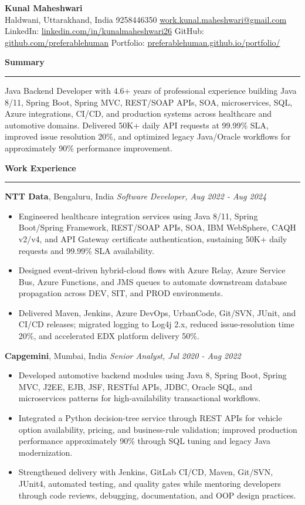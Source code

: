 \documentclass[10pt,letterpaper]{article}
\newcommand{\ressection}[1]{\vspace{3pt}\par\textbf{#1}\par\vspace{1pt}\hrule\vspace{2pt}}
\begin{document}
\pagestyle{empty}\raggedright\fontsize{10.15}{11.05}\selectfont

{\Large \textbf{Kunal Maheshwari}}\\
Haldwani, Uttarakhand, India \textbar{} 9258446350 \textbar{} \href{mailto:work.kunal.maheshwari@gmail.com}{work.kunal.maheshwari@gmail.com}\\
LinkedIn: \href{https://www.linkedin.com/in/kunalmaheshwari26}{linkedin.com/in/kunalmaheshwari26} \textbar{} GitHub: \href{https://github.com/preferablehuman}{github.com/preferablehuman} \textbar{} Portfolio: \href{https://preferablehuman.github.io/portfolio/}{preferablehuman.github.io/portfolio/}

\ressection{Summary}
Java Backend Developer with 4.6+ years of professional experience building Java 8/11, Spring Boot, Spring MVC, REST/SOAP APIs, SOA, microservices, SQL, Azure integrations, CI/CD, and production systems across healthcare and automotive domains. Delivered 50K+ daily API requests at 99.99\% SLA, improved issue resolution 20\%, and optimized legacy Java/Oracle workflows for approximately 90\% performance improvement.

\ressection{Work Experience}
\textbf{NTT Data}, Bengaluru, India \hfill \textit{Software Developer, Aug 2022 - Aug 2024}
\begin{itemize}
  \item Engineered healthcare integration services using Java 8/11, Spring Boot/Spring Framework, REST/SOAP APIs, SOA, IBM WebSphere, CAQH v2/v4, and API Gateway certificate authentication, sustaining 50K+ daily requests and 99.99\% SLA availability.
  \item Designed event-driven hybrid-cloud flows with Azure Relay, Azure Service Bus, Azure Functions, and JMS queues to automate downstream database propagation across DEV, SIT, and PROD environments.
  \item Delivered Maven, Jenkins, Azure DevOps, UrbanCode, Git/SVN, JUnit, and CI/CD releases; migrated logging to Log4j 2.x, reduced issue-resolution time 20\%, and accelerated EDX platform delivery 50\%.
\end{itemize}
\textbf{Capgemini}, Mumbai, India \hfill \textit{Senior Analyst, Jul 2020 - Aug 2022}
\begin{itemize}
  \item Developed automotive backend modules using Java 8, Spring Boot, Spring MVC, J2EE, EJB, JSF, RESTful APIs, JDBC, Oracle SQL, and microservices patterns for high-availability transactional workflows.
  \item Integrated a Python decision-tree service through REST APIs for vehicle option availability, pricing, and business-rule validation; improved production performance approximately 90\% through SQL tuning and legacy Java modernization.
  \item Strengthened delivery with Jenkins, GitLab CI/CD, Maven, Git/SVN, JUnit4, automated testing, and quality gates while mentoring developers through code reviews, debugging, documentation, and OOP design practices.
\end{itemize}
\end{document}
